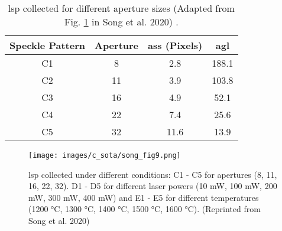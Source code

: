     \begin{table}[ht]
        \centering
        \footnotesize
        \renewcommand{\arraystretch}{1.2}
        \begin{tabular}{cccc}
            \toprule
            \textbf{Speckle Pattern} & \textbf{Aperture} & \textbf{\gls{ass} (Pixels)} & \textbf{\gls{agl}} \\
            \midrule
            
            C1 & 8 & 2.8 & 188.1 \\
            C2 & 11 & 3.9 & 103.8 \\
            C3 & 16 & 4.9 & 52.1 \\
            C4 & 22 & 7.4 & 25.6 \\
            C5 & 32 & 11.6 & 13.9 \\
    
            \bottomrule
        \end{tabular}
        \caption{\gls{lsp} collected for different aperture sizes (Adapted from Fig. \ref{fig:song_fig9} in Song et al. 2020) \cite{song}.}
        \label{table:song_table_c}
    \end{table}

    \begin{figure}[ht]
        \centering
        \texttt{[image: images/c\_sota/song\_fig9.png]}
        \caption{\gls{lsp} collected under different conditions: C1 - C5 for apertures (8, 11, 16, 22, 32). D1 - D5 for different laser powers (10 mW, 100 mW, 200 mW, 300 mW, 400 mW) and E1 - E5 for different temperatures (1200 °C, 1300 °C, 1400 °C, 1500 °C, 1600 °C). (Reprinted from Song et al. 2020) \cite{song}}
        \label{fig:song_fig9}
    \end{figure} 


    
